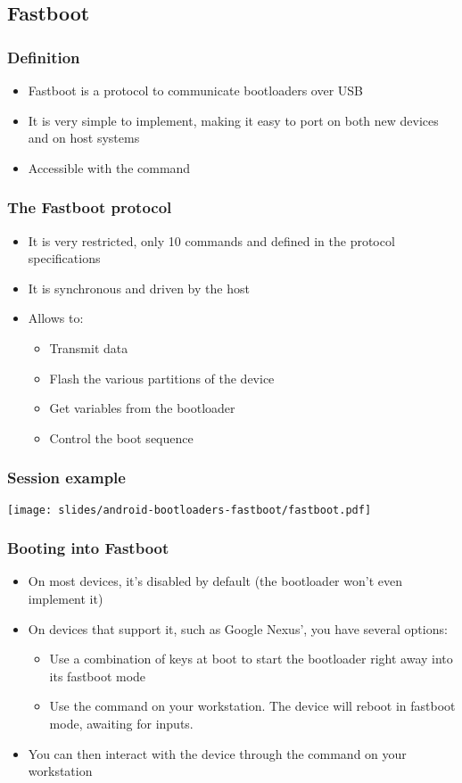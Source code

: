 \subsection{Fastboot}
\begin{frame}
  \frametitle{Definition}
  \begin{itemize}
  \item Fastboot is a protocol to communicate bootloaders over
    USB
  \item It is very simple to implement, making it easy to port on
    both new devices and on host systems
  \item Accessible with the  command
  \end{itemize}
\end{frame}

\begin{frame}
  \frametitle{The Fastboot protocol}
  \begin{itemize}
  \item It is very restricted, only 10 commands and defined in the
    protocol specifications
  \item It is synchronous and driven by the host
  \item Allows to:
    \begin{itemize}
      \item Transmit data
      \item Flash the various partitions of the device
      \item Get variables from the bootloader
      \item Control the boot sequence
    \end{itemize}
  \end{itemize}
\end{frame}

\begin{frame}
  \frametitle{Session example}
  \begin{center}
    \texttt{[image: slides/android-bootloaders-fastboot/fastboot.pdf]}
  \end{center}
\end{frame}

\begin{frame}
  \frametitle{Booting into Fastboot}
  \begin{itemize}
  \item On most devices, it's disabled by default (the bootloader
    won't even implement it)
  \item On devices that support it, such as Google Nexus', you have
    several options:
    \begin{itemize}
    \item Use a combination of keys at boot to start the bootloader
      right away into its fastboot mode
    \item Use the  command on your
      workstation. The device will reboot in fastboot mode, awaiting
      for inputs.
    \end{itemize}
  \item You can then interact with the device through the
     command on your workstation
  \end{itemize}
\end{frame}

